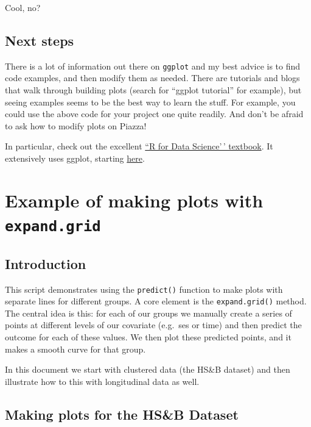 \documentclass[
  letterpaper,
  DIV=11,
  numbers=noendperiod]{scrreprt}
\begin{document}
Cool, no?

\hypertarget{next-steps}{%
\section{Next steps}\label{next-steps}}

There is a lot of information out there on \texttt{ggplot} and my best
advice is to find code examples, and then modify them as needed. There
are tutorials and blogs that walk through building plots (search for
``ggplot tutorial'' for example), but seeing examples seems to be the
best way to learn the stuff. For example, you could use the above code
for your project one quite readily. And don't be afraid to ask how to
modify plots on Piazza!

In particular, check out the excellent \href{http://r4ds.had.co.nz}{``R
for Data Science'\,' textbook}. It extensively uses ggplot, starting
\href{http://r4ds.had.co.nz/data-visualisation.html}{here}.

\hypertarget{example-of-making-plots-with-expand.grid}{%
\chapter{\texorpdfstring{Example of making plots with
\texttt{expand.grid}}{Example of making plots with expand.grid}}\label{example-of-making-plots-with-expand.grid}}

\hypertarget{introduction-2}{%
\section{Introduction}\label{introduction-2}}

This script demonstrates using the \texttt{predict()} function to make
plots with separate lines for different groups. A core element is the
\texttt{expand.grid()} method. The central idea is this: for each of our
groups we manually create a series of points at different levels of our
covariate (e.g.~ses or time) and then predict the outcome for each of
these values. We then plot these predicted points, and it makes a smooth
curve for that group.

In this document we start with clustered data (the HS\&B dataset) and
then illustrate how to this with longitudinal data as well.

\hypertarget{making-plots-for-the-hsb-dataset}{%
\section{Making plots for the HS\&B
Dataset}\label{making-plots-for-the-hsb-dataset}}
\end{document}

